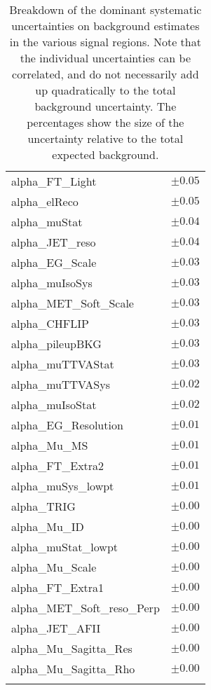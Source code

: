 \begin{table}
\begin{center}
\begin{tabular*}{\textwidth}{@{\extracolsep{\fill}}lc}
alpha\_FT\_Light         & $\pm 0.05$       \\
alpha\_elReco         & $\pm 0.05$       \\
alpha\_muStat         & $\pm 0.04$       \\
alpha\_JET\_reso         & $\pm 0.04$       \\
alpha\_EG\_Scale         & $\pm 0.03$       \\
alpha\_muIsoSys         & $\pm 0.03$       \\
alpha\_MET\_Soft\_Scale         & $\pm 0.03$       \\
alpha\_CHFLIP         & $\pm 0.03$       \\
alpha\_pileupBKG         & $\pm 0.03$       \\
alpha\_muTTVAStat         & $\pm 0.03$       \\
alpha\_muTTVASys         & $\pm 0.02$       \\
alpha\_muIsoStat         & $\pm 0.02$       \\
alpha\_EG\_Resolution         & $\pm 0.01$       \\
alpha\_Mu\_MS         & $\pm 0.01$       \\
alpha\_FT\_Extra2         & $\pm 0.01$       \\
alpha\_muSys\_lowpt         & $\pm 0.01$       \\
alpha\_TRIG         & $\pm 0.00$       \\
alpha\_Mu\_ID         & $\pm 0.00$       \\
alpha\_muStat\_lowpt         & $\pm 0.00$       \\
alpha\_Mu\_Scale         & $\pm 0.00$       \\
alpha\_FT\_Extra1         & $\pm 0.00$       \\
alpha\_MET\_Soft\_reso\_Perp         & $\pm 0.00$       \\
alpha\_JET\_AFII         & $\pm 0.00$       \\
alpha\_Mu\_Sagitta\_Res         & $\pm 0.00$       \\
alpha\_Mu\_Sagitta\_Rho         & $\pm 0.00$       \\
\noalign{\smallskip}\hline\noalign{\smallskip}
\end{tabular*}
\end{center}
\caption[Breakdown of uncertainty on background estimates]{
Breakdown of the dominant systematic uncertainties on background estimates in the various signal regions.
Note that the individual uncertainties can be correlated, and do not necessarily add up quadratically to 
the total background uncertainty. The percentages show the size of the uncertainty relative to the total expected background.
\label{table.results.bkgestimate.uncertainties.Rpc3L1bS}}
\end{table}
\clearpage
%